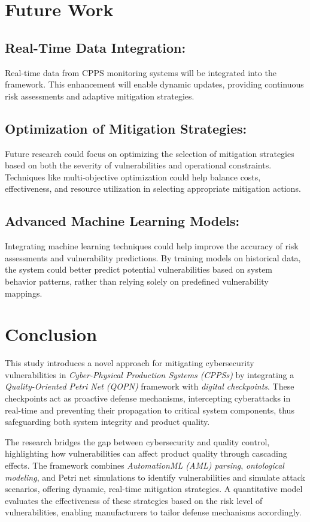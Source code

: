 \documentclass[conference]{IEEEtran}
\begin{document}
\section{Future Work}
\subsection{Real-Time Data Integration:}
Real-time data from CPPS monitoring systems will be integrated into the framework. This enhancement will enable dynamic updates, providing continuous risk assessments and adaptive mitigation strategies.

\subsection{Optimization of Mitigation Strategies:}
Future research could focus on optimizing the selection of mitigation strategies based on both the severity of vulnerabilities and operational constraints. Techniques like multi-objective optimization could help balance costs, effectiveness, and resource utilization in selecting appropriate mitigation actions.

\subsection{Advanced Machine Learning Models:}
Integrating machine learning techniques could help improve the accuracy of risk assessments and vulnerability predictions. By training models on historical data, the system could better predict potential vulnerabilities based on system behavior patterns, rather than relying solely on predefined vulnerability mappings.


\section{Conclusion}
This study introduces a novel approach for mitigating cybersecurity vulnerabilities in \textit{Cyber-Physical Production Systems (CPPSs)} by integrating a \textit{Quality-Oriented Petri Net (QOPN)} framework with \textit{digital checkpoints}. These checkpoints act as proactive defense mechanisms, intercepting cyberattacks in real-time and preventing their propagation to critical system components, thus safeguarding both system integrity and product quality.

The research bridges the gap between cybersecurity and quality control, highlighting how vulnerabilities can affect product quality through cascading effects. The framework combines \textit{AutomationML (AML) parsing}, \textit{ontological modeling}, and Petri net simulations to identify vulnerabilities and simulate attack scenarios, offering dynamic, real-time mitigation strategies. A quantitative model evaluates the effectiveness of these strategies based on the risk level of vulnerabilities, enabling manufacturers to tailor defense mechanisms accordingly.
\end{document}
